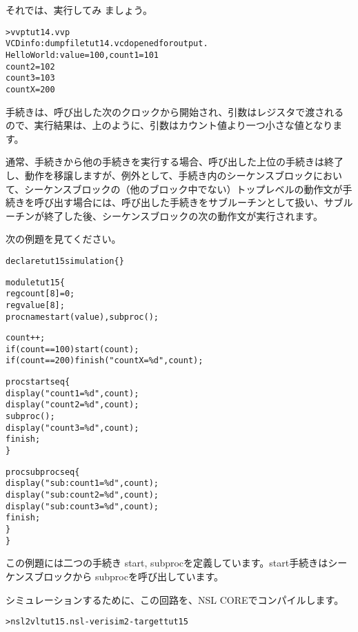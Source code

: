 それでは、実行してみ ましょう。

\begin{reviewcmd}
\begin{alltt}
\textgreater{} vvp tut14.vvp
VCD info: dumpfile tut14.vcd opened for output.
Hello World: value = 100, count1 = 101
count2 = 102
count3 = 103
countX = 200
\end{alltt}
\end{reviewcmd}

手続きは、呼び出した次のクロックから開始され、引数はレジスタで渡されるので、実行結果は、上のように、引数はカウント値より一つ小さな値となります。

通常、手続きから他の手続きを実行する場合、呼び出した上位の手続きは終了し、動作を移譲しますが、例外として、手続き内のシーケンスブロックにおいて、シーケンスブロックの（他のブロック中でない）トップレベルの動作文が手続きを呼び出す場合には、呼び出した手続きをサブルーチンとして扱い、サブルーチンが終了した後、シーケンスブロックの次の動作文が実行されます。

次の例題を見てください。

\begin{reviewlist}
\begin{alltt}
declare tut15 simulation \{ \}

module tut15 \{
    reg count[8] = 0;
    reg value[8];
    proc\textunderscore{}name  start(value), subproc();

    count++;
    if(count==100) start(count);
    if(count==200) \textunderscore{}finish("countX = \%d", count);

    proc start seq \{
        \textunderscore{}display("count1 = \%d", count);
        \textunderscore{}display("count2 = \%d", count);
	subproc();
        \textunderscore{}display("count3 = \%d", count);
	finish;
    \}

    proc subproc seq \{
        \textunderscore{}display("sub:count1 = \%d", count);
        \textunderscore{}display("sub:count2 = \%d", count);
        \textunderscore{}display("sub:count3 = \%d", count);
	finish;
    \}
\}
\end{alltt}
\end{reviewlist}


この例題には二つの手続き start, subprocを定義しています。start手続きはシーケンスブロックから subprocを呼び出しています。

シミュレーションするために、この回路を、NSL COREでコンパイルします。

\begin{reviewcmd}
\begin{alltt}
\textgreater{} nsl2vl tut15.nsl -verisim2 -target tut15
\end{alltt}
\end{reviewcmd}

